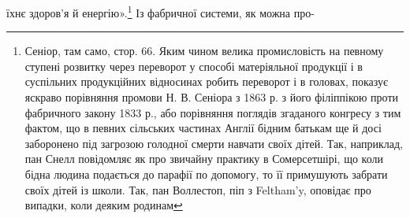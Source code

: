їхнє здоров’я й енергію».\footnote{
Сеніор, там само, стор. 66. Яким чином велика промисловість на
певному ступені розвитку через переворот у способі матеріяльної продукції
і в суспільних продукційних відносинах робить переворот і в головах,
показує яскраво порівняння промови Н. В. Сеніора з 1863 р. з його філіппікою
проти фабричного закону 1833 р., або порівняння поглядів згаданого
конгресу з тим фактом, що в певних сільських частинах Англії бідним
батькам ще й досі заборонено під загрозою голодної смерти навчати
своїх дітей. Так, наприклад, пан Снелл повідомляє як про звичайну практику
в Сомерсетшірі, що коли бідна людина подається до парафії
по допомогу, то її примушують забрати своїх дітей із школи. Так, пан
Воллестоп, піп з Feltham’y, оповідає про випадки, коли деяким родинам
} Із фабричної системи, як можна про-